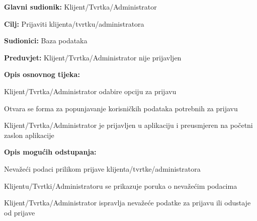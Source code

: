 \noindent {}
\begin{packed_item}

	\item \textbf{Glavni sudionik:} Klijent/Tvrtka/Administrator
	\item \textbf{Cilj:} Prijaviti klijenta/tvrtku/administratora
	\item \textbf{Sudionici:} Baza podataka
	\item \textbf{Preduvjet:} Klijent/Tvrtka/Administrator nije prijavljen
	\item \textbf{Opis osnovnog tijeka:}
	
	\item[] \begin{packed_enum}
		
		\item Klijent/Tvrtka/Administrator odabire opciju za prijavu
		\item Otvara se forma za popunjavanje korisničkih podataka potrebnih za prijavu
		\item Klijent/Tvrtka/Administrator je prijavljen u aplikaciju i preusmjeren na početni zaslon aplikacije

	\end{packed_enum}

	\item  \textbf{Opis mogućih odstupanja:}
	
	\item[] \begin{packed_item}
	
		\item[2.a] Nevažeći podaci prilikom prijave klijenta/tvrtke/administratora
		\item[] \begin{packed_enum}
			
			\item Klijentu/Tvrtki/Administratoru se prikazuje poruka o nevažećim podacima
			\item Klijent/Tvrtka/Administrator ispravlja nevažeće podatke za prijavu ili odustaje od prijave
			
		\end{packed_enum}

	\end{packed_item}
\end{packed_item}

